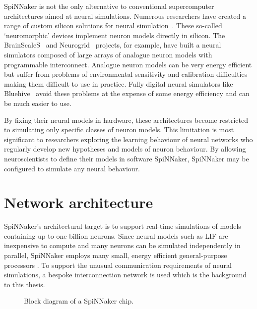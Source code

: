 		SpiNNaker is not the only alternative to conventional supercomputer
		architectures aimed at neural simulations. Numerous researchers have
		created a range of custom silicon solutions for neural
		simulation~\cite{misra10}. These so-called `neuromorphic' devices implement
		neuron models directly in silicon. The BrainScaleS~\cite{schemmel10} and
		Neurogrid~\cite{benjamin14} projects, for example, have built a neural
		simulators composed of large arrays of analogue neuron models with
		programmable interconnect. Analogue neuron models can be very energy
		efficient but suffer from problems of environmental sensitivity and
		calibration difficulties making them difficult to use in practice. Fully
		digital neural simulators like Bluehive~\cite{moore12} avoid these problems
		at the expense of some energy efficiency and can be much easier to use.
		
		By fixing their neural models in hardware, these architectures become
		restricted to simulating only specific classes of neuron models. This
		limitation is most significant to researchers exploring the learning
		behaviour of neural networks who regularly develop new hypotheses and
		models of neuron behaviour. By allowing neuroscientists to define their
		models in software SpiNNaker, SpiNNaker may be configured to simulate any
		neural behaviour.
	
	\section{Network architecture}
		
		SpiNNaker's architectural target is to support real-time simulations of
		models containing up to one billion neurons. Since neural models such as
		LIF are inexpensive to compute and many neurons can be simulated
		independently in parallel, SpiNNaker employs many small, energy efficient
		general-purpose processors \cite{furber07}.  To support the unusual
		communication requirements of neural simulations, a bespoke interconnection
		network is used which is the background to this thesis.
		
		
		\begin{figure}
			\center
			
			\caption[SpiNNaker chips connected to their six neighbours.]%
			{SpiNNaker chips (actual size) connected to their six neighbours.}
			\label{fig:hex-chips}
			\vspace*{1.5cm}
			
			\center
			
			\caption{Block diagram of a SpiNNaker chip.}
			\label{fig:spinnaker-chip}
		\end{figure}
		
